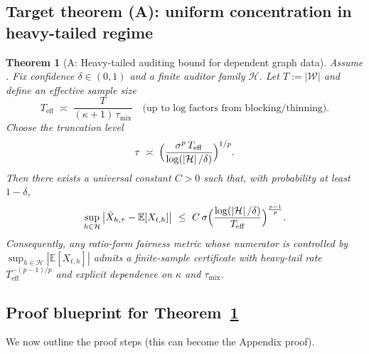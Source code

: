 \documentclass[11pt]{article}
\newcommand{\E}{\mathbb{E}}
\newcommand{\1}{\mathbf{1}}
\newcommand{\cH}{\mathcal{H}}
\newcommand{\cW}{\mathcal{W}}
\newcommand{\abs}[1]{\left|#1\right|}
\theoremstyle{plain}
\newtheorem{theorem}{Theorem}[section]
\theoremstyle{definition}
\theoremstyle{remark}
\begin{document}
\subsection{Target theorem (A): uniform concentration in heavy-tailed regime}
\begin{theorem}[A: Heavy-tailed auditing bound for dependent graph data]\label{thm:A_trunc}
Assume .
Fix confidence $\delta\in(0,1)$ and a finite auditor family $\cH$.
Let $T:=|\cW|$ and define an \emph{effective sample size}
\[
T_{\mathrm{eff}} \;\asymp\; \frac{T}{(\kappa+1)\,\tau_{\mathrm{mix}}}
\quad\text{(up to log factors from blocking/thinning).}
\]
Choose the truncation level
\[
\tau \;\asymp\; \Bigl(\frac{\sigma^p\,T_{\mathrm{eff}}}{\log(\abs{\cH}/\delta)}\Bigr)^{1/p}.
\]
Then there exists a universal constant $C>0$ such that, with probability at least $1-\delta$,
\[
\sup_{h\in\cH}\abs{\bar X_{h,\tau}-\E[X_{t,h}]}
\ \le\
C\,\sigma\Bigl(\frac{\log(\abs{\cH}/\delta)}{T_{\mathrm{eff}}}\Bigr)^{\frac{p-1}{p}}.
\]
Consequently, any ratio-form fairness metric whose numerator is controlled by $\sup_{h\in\cH}\abs{\E[X_{t,h}]}$
admits a finite-sample certificate with heavy-tail rate $T_{\mathrm{eff}}^{-(p-1)/p}$ and explicit dependence on
$\kappa$ and $\tau_{\mathrm{mix}}$.
\end{theorem}

\subsection{Proof blueprint for Theorem~\ref{thm:A_trunc}}
We now outline the proof steps (this can become the Appendix proof).
\end{document}

